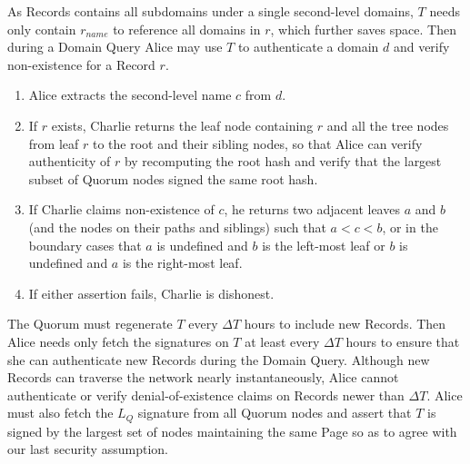 As Records contains all subdomains under a single second-level domains, $ T $ needs only contain $ r_{\mathit{name}} $ to reference all domains in $ r $, which further saves space. Then during a Domain Query Alice may use $ T $ to authenticate a domain $ d $ and verify non-existence for a Record $ r $.

\begin{enumerate}
	\item Alice extracts the second-level name $ c $ from $ d $.
	\item If $ r $ exists, Charlie returns the leaf node containing $ r $ and all the tree nodes from leaf $ r $ to the root and their sibling nodes, so that Alice can verify authenticity of $ r $ by recomputing the root hash and verify that the largest subset of Quorum nodes signed the same root hash.
	\item If Charlie claims non-existence of $ c $, he returns two adjacent leaves $ a $ and $ b $ (and the nodes on their paths and siblings) such that $ a < c < b $, or in the boundary cases that $ a $ is undefined and $ b $ is the left-most leaf or $ b $ is undefined and $ a $ is the right-most leaf.
	\item If either assertion fails, Charlie is dishonest.
\end{enumerate}

The Quorum must regenerate $ T $ every $ \Delta T $ hours to include new Records. Then Alice needs only fetch the signatures on $ T $ at least every $ \Delta T $ hours to ensure that she can authenticate new Records during the Domain Query. Although new Records can traverse the network nearly instantaneously, Alice cannot authenticate or verify denial-of-existence claims on Records newer than $ \Delta T $. Alice must also fetch the $ L_{Q} $ signature from all Quorum nodes and assert that $ T $ is signed by the largest set of nodes maintaining the same Page so as to agree with our last security assumption.








